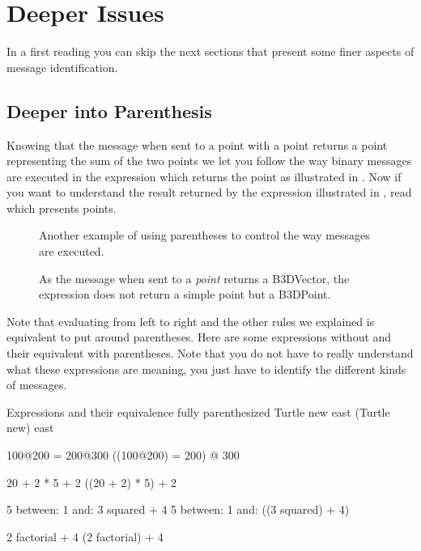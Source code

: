 \documentclass[a4paper,10pt,twoside]{book}
\begin{document}
	\renewcommand{\nnbb}[2]{} %
	\sloppy
\fi

\section{Deeper Issues}
In a first reading you can skip the next sections that present some finer aspects of message identification.

\subsection{Deeper into Parenthesis}
Knowing that the message \ct{+} when sent to a point with a point returns a point representing the sum of the two points we let you follow the way binary messages are executed in the expression  which returns the point  as illustrated in . Now if you want to understand the result returned by the expression  illustrated in , read  which presents points.


\begin{figure}[ht]
\caption{Another example of using parentheses to control the way messages are executed.\label{fig:compoBinBracket}}
\end{figure}

\begin{figure}[ht]
\caption{As the message  when sent to a \textit{point} returns a B3DVector, the expression does not return a simple point but a B3DPoint.  \label{fig:compoBinNoBracket}}
\end{figure}




Note that evaluating from left to right and the other rules we explained is equivalent to put around parentheses. Here are some expressions without and their equivalent with parentheses. Note that you do not have to really understand what these expressions are meaning, you just have to identify the different kinds of messages.

\begin{script}{Expressions and their equivalence fully parenthesized}
Turtle new east 
    (Turtle new) east

100@200 = 200@300
	((100@200) = 200) @ 300
	
20 + 2 * 5 + 2
   ((20 + 2) * 5) + 2

5 between: 1 and: 3 squared + 4
   5 between: 1 and: ((3 squared) + 4)

2 factorial + 4
    (2 factorial) + 4
\end{script}
\end{document}
